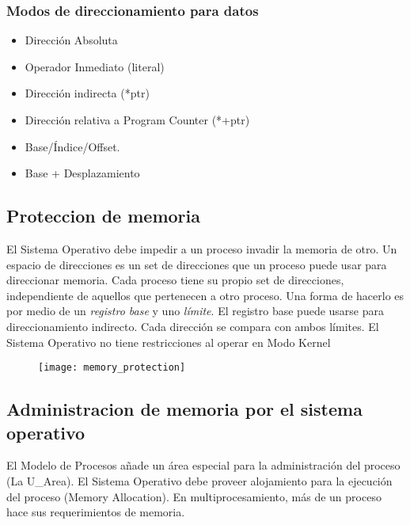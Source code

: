 \documentclass[a4paper, twoside]{article}
\begin{document}
\subsubsection{Modos de direccionamiento para datos}
\begin{itemize}
	\item Dirección Absoluta
	\item Operador Inmediato (literal)
	\item Dirección indirecta (*ptr)
	\item Dirección relativa a Program Counter (*+ptr)
	\item Base/Índice/Offset.
	\item Base + Desplazamiento
\end{itemize}

\subsection{Proteccion de memoria}
El Sistema Operativo debe impedir a un proceso invadir la memoria de otro.
Un espacio de direcciones es un set de direcciones que un proceso puede usar para direccionar memoria. Cada proceso tiene su propio set de direcciones, independiente de aquellos que pertenecen a otro proceso.
Una forma de hacerlo es por medio de un \emph{registro base} y uno \emph{límite}. El registro base puede usarse para direccionamiento indirecto. Cada dirección se compara con ambos límites.
El Sistema Operativo no tiene restricciones al operar en Modo Kernel

\begin{figure}[H]
	\centering
	\texttt{[image: memory\_protection]}
	\label{fig:memory_protection}
\end{figure}

\subsection{Administracion de memoria por el sistema operativo}
El Modelo de Procesos añade un área especial para la administración del proceso (La U\_Area).
El Sistema Operativo debe proveer alojamiento para la ejecución del proceso (Memory Allocation).
En multiprocesamiento, más de un proceso hace sus requerimientos de memoria.
\end{document}
